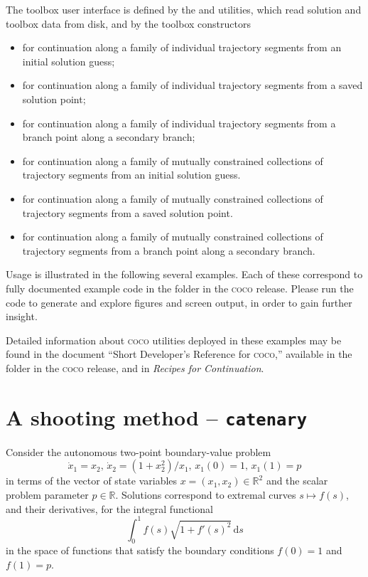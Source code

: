 The toolbox user interface is defined by the  and  utilities, which read solution and toolbox data from disk, and by the toolbox constructors
\begin{itemize}
\item  {} for continuation along a family of individual trajectory segments from an initial solution guess;
\item {} for continuation along a family of individual trajectory segments from a saved solution point;
\item {} for continuation along a family of individual trajectory segments from a branch point along a secondary branch;
\item {} for continuation along a family of mutually constrained collections of trajectory segments from an initial solution guess.
\item {} for continuation along a family of mutually constrained collections of trajectory segments from a saved solution point.
\item {} for continuation along a family of mutually constrained collections of trajectory segments from a branch point along a secondary branch.
\end{itemize}
Usage is illustrated in the following several examples. Each of these correspond to fully documented example code in the  folder in the \textsc{coco} release. Please run the code to generate and explore figures and screen output, in order to gain further insight.

Detailed information about \textsc{coco} utilities deployed in these examples may be found in the document ``Short Developer's Reference for \textsc{coco},'' available in the  folder in the \textsc{coco} release, and in \emph{Recipes for Continuation}.

\section{A shooting method -- \texttt{catenary}}
Consider the autonomous two-point boundary-value problem
\begin{equation}
\dot{x}_1=x_2,\,\dot{x}_2=(1+x_2^2)/x_1,\,x_1(0)=1,\,x_1(1)=p
\end{equation}
in terms of the vector of state variables $x=(x_1,x_2)\in\mathbb{R}^2$ and the scalar problem parameter $p\in\mathbb{R}$. Solutions correspond to extremal curves $s\mapsto f(s)$, and their derivatives, for the integral functional
\begin{equation}
\int_0^1 f(s)\sqrt{1+f'(s)^2}\,\mathrm{d}s
\end{equation}
in the space of functions that satisfy the boundary conditions $f(0)=1$ and $f(1)=p$.

